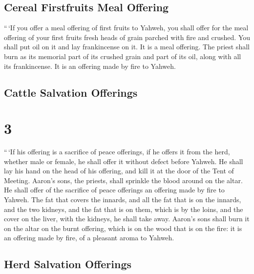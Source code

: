 \hypertarget{cereal-firstfruits-meal-offering}{%
\subsection{Cereal Firstfruits Meal
Offering}\label{cereal-firstfruits-meal-offering}}

 ``\,`If you offer a meal offering of first fruits to
Yahweh, you shall offer for the meal offering of your first fruits fresh
heads of grain parched with fire and crushed.  You shall
put oil on it and lay frankincense on it. It is a meal offering.
 The priest shall burn as its memorial part of its
crushed grain and part of its oil, along with all its frankincense. It
is an offering made by fire to Yahweh.

\hypertarget{cattle-salvation-offerings}{%
\subsection{Cattle Salvation
Offerings}\label{cattle-salvation-offerings}}

\hypertarget{section-2}{%
\section{3}\label{section-2}}

 ``\,`If his offering is a sacrifice of peace offerings,
if he offers it from the herd, whether male or female, he shall offer it
without defect before Yahweh.  He shall lay his hand on
the head of his offering, and kill it at the door of the Tent of
Meeting. Aaron's sons, the priests, shall sprinkle the blood around on
the altar.  He shall offer of the sacrifice of peace
offerings an offering made by fire to Yahweh. The fat that covers the
innards, and all the fat that is on the innards,  and the
two kidneys, and the fat that is on them, which is by the loins, and the
cover on the liver, with the kidneys, he shall take away. 
Aaron's sons shall burn it on the altar on the burnt offering, which is
on the wood that is on the fire: it is an offering made by fire, of a
pleasant aroma to Yahweh.

\hypertarget{herd-salvation-offerings}{%
\subsection{Herd Salvation Offerings}\label{herd-salvation-offerings}}

